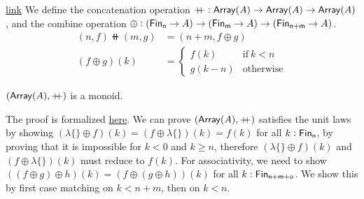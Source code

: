 \begin{definition}{\href{https://windtfw.com/agda-symmetries/Cubical.Structures.Set.Mon.Array.html#6958}{link}}
    We define the concatenation operation $\mathbin{+\kern -0.4em+} : \operatorname{\mathsf{Array}}(A) \to \operatorname{\mathsf{Array}}(A) \to \operatorname{\mathsf{Array}}(A)$,
    and the combine operation $\oplus : (\Fin[n] \to A) \to (\Fin[m] \to A) \to (\Fin[n+m] \to\nolinebreak A)$.
    \begin{align*}
        (n , f) \doubleplus (m , g) & = (n + m , f \oplus g)        \\
        (f \oplus g)(k)             & = \begin{cases}
                                            f(k)     & \text{if}\ k < n \\
                                            g(k - n) & \text{otherwise}
                                        \end{cases}
    \end{align*}
\end{definition}

\begin{propositionrep}%
    $(\operatorname{\mathsf{Array}}(A), \mathbin{+\kern -0.4em+})$ is a monoid.
\end{propositionrep}

\begin{proofsketch}
    The proof is formalized \href{https://windtfw.com/agda-symmetries/Cubical.Structures.Set.Mon.Array.html#19252}{here}.
    We can prove $(\operatorname{\mathsf{Array}}(A), \mathbin{+\kern -0.4em+})$ satisfies the unit laws by showing
    $(\lambda\{\} \oplus f)(k) = (f \oplus \lambda\{\})(k) = f(k)$ for all $k : \Fin[n]$,
    by proving that it is impossible for $k < 0$ and $k \geq n$, therefore
    $(\lambda\{\} \oplus f)(k)$ and $(f \oplus \lambda\{\})(k)$ must reduce to $f(k)$.
    For associativity,
    we need to show $((f \oplus g) \oplus h)(k) = (f \oplus (g \oplus h))(k)$ for all $k : \Fin[n+m+o]$.
    We show this by first case matching on $k < n+m$, then on $k < n$.
\end{proofsketch}

